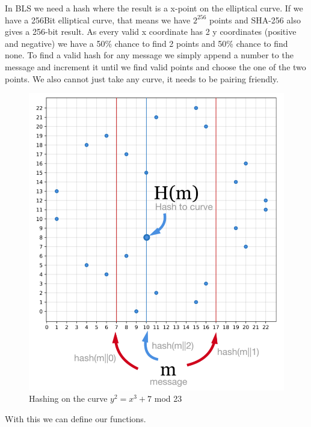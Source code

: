 \documentclass[a4paper,12pt]{scrartcl}
\begin{document}
In BLS we need a hash where the result is a x-point on the elliptical curve. If we have a 256Bit elliptical curve, that means we have $2^{256}$ points and SHA-256 also gives a 256-bit result. As every valid x coordinate has 2 y coordinates (positive and negative) we have a 50\% chance to find 2 points and 50\% chance to find none. To find a valid hash for any message we simply append a number to the message and increment it until we find valid points and choose the one of the two points. We also cannot just take any curve, it needs to be pairing friendly.
\begin{figure}[hbt!]
	\centering
	\includegraphics[width=0.5\linewidth]{bls-hash}
	\caption{Hashing on the curve $y^2=x^3+7$ mod 23}
\end{figure}

With this we can define our functions.
\end{document}
